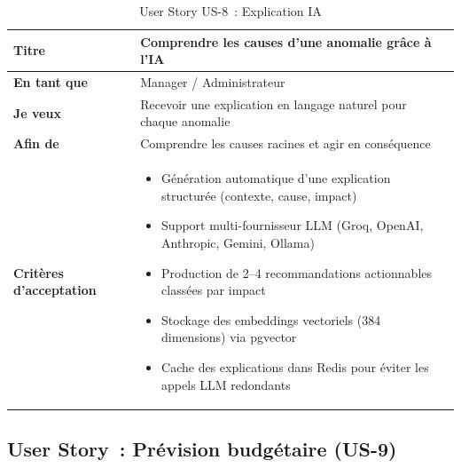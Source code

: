 \begin{table}[H]
\centering
\caption{User Story US-8~: Explication IA}
\label{tab:us8}
\begin{tabularx}{\textwidth}{|l|X|}
\hline
\textbf{Titre} & Comprendre les causes d'une anomalie grâce à l'IA \\
\hline
\textbf{En tant que} & Manager / Administrateur \\
\hline
\textbf{Je veux} & Recevoir une explication en langage naturel pour chaque anomalie \\
\hline
\textbf{Afin de} & Comprendre les causes racines et agir en conséquence \\
\hline
\textbf{Critères d'acceptation} & \begin{minipage}[t]{\linewidth}\vspace{2pt}
\begin{itemize}[noitemsep,topsep=0pt]
\item Génération automatique d'une explication structurée (contexte, cause, impact)
\item Support multi-fournisseur LLM (Groq, OpenAI, Anthropic, Gemini, Ollama)
\item Production de 2--4 recommandations actionnables classées par impact
\item Stockage des embeddings vectoriels (384 dimensions) via pgvector
\item Cache des explications dans Redis pour éviter les appels LLM redondants
\end{itemize}\vspace{2pt}
\end{minipage} \\
\hline
\end{tabularx}
\end{table}

\subsection{User Story~: Prévision budgétaire (US-9)}

